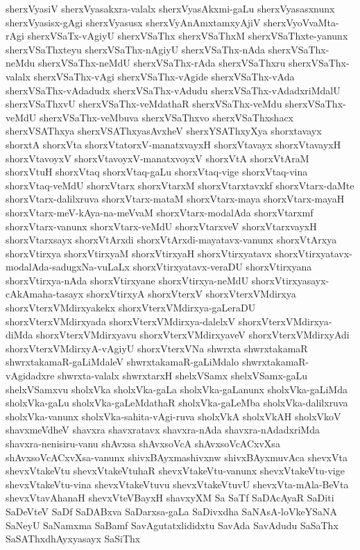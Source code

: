 {sherxVyasiV
sherxVyasakxra-valalx
sherxVyasAkxmi-gaLu
sherxVyasasxnunx
sherxVyasisx-gAgi
sherxVyasusx
sherxVyAnAmxtamxyAjiV
sherxVyoVvaMta-rAgi
sherxVSaTx-vAgiyU
sherxVSaThx
sherxVSaThxM
sherxVSaThxte-yanunx
sherxVSaThxteyu
sherxVSaThx-nAgiyU
sherxVSaThx-nAda
sherxVSaThx-neMdu
sherxVSaThx-neMdU
sherxVSaThx-rAda
sherxVSaThxru
sherxVSaThx-valalx
sherxVSaThx-vAgi
sherxVSaThx-vAgide
sherxVSaThx-vAda
sherxVSaThx-vAdadudx
sherxVSaThx-vAdudu
sherxVSaThx-vAdadxriMdalU
sherxVSaThxvU
sherxVSaThx-veMdathaR
sherxVSaThx-veMdu
sherxVSaThx-veMdU
sherxVSaThx-veMbuva
sherxVSaThxvo
sherxVSaThxshacx
sherxVSAThxya
sherxVSAThxyasAvxheV
sherxYSAThxyXya
shorxtavayx
shorxtA
shorxVta
shorxVtatorxV-manatxvayxH
shorxVtavayx
shorxVtavayxH
shorxVtavoyxV
shorxVtavoyxV-manatxvoyxV
shorxVtA
shorxVtAraM
shorxVtuH
shorxVtaq
shorxVtaq-gaLu
shorxVtaq-vige
shorxVtaq-vina
shorxVtaq-veMdU
shorxVtarx
shorxVtarxM
shorxVtarxtavxkf
shorxVtarx-daMte
shorxVtarx-dalilxruva
shorxVtarx-mataM
shorxVtarx-maya
shorxVtarx-mayaH
shorxVtarx-meV-kAya-na-meVvaM
shorxVtarx-modalAda
shorxVtarxmf
shorxVtarx-vanunx
shorxVtarx-veMdU
shorxVtarxveV
shorxVtarxvayxH
shorxVtarxsayx
shorxVtArxdi
shorxVtArxdi-mayatavx-vanunx
shorxVtArxya
shorxVtirxya
shorxVtirxyaM
shorxVtirxyaH
shorxVtirxyatavx
shorxVtirxyatavx-modalAda-sadugxNa-vuLaLx
shorxVtirxyatavx-veraDU
shorxVtirxyana
shorxVtirxya-nAda
shorxVtirxyane
shorxVtirxya-neMdU
shorxVtirxyasayx-cAkAmaha-tasayx
shorxVtirxyA
shorxVterxV
shorxVterxVMdirxya
shorxVterxVMdirxyakekx
shorxVterxVMdirxya-gaLeraDU
shorxVterxVMdirxyada
shorxVterxVMdirxya-dalelxV
shorxVterxVMdirxya-diMda
shorxVterxVMdirxyavu
shorxVterxVMdirxyaveV
shorxVterxVMdirxyAdi
shorxVterxVMdirxyA-vAgiyU
shorxVterxVNa
shwrxta
shwrxtakamaR
shwrxtakamaR-gaLiMdaleV
shwrxtakamaR-gaLiMdalo
shwrxtakamaR-vAgidadxre
shwrxta-valalx
shwrxtarxH
shelxVSamx
shelxVSamx-gaLu
shelxVSamxvu
sholxVka
sholxVka-gaLa
sholxVka-gaLanunx
sholxVka-gaLiMda
sholxVka-gaLu
sholxVka-gaLeMdathaR
sholxVka-gaLeMba
sholxVka-dalilxruva
sholxVka-vanunx
sholxVka-sahita-vAgi-ruva
sholxVkA
sholxVkAH
sholxVkoV
shavxmeVdheV
shavxra
shavxratavx
shavxra-nAda
shavxra-nAdadxriMda
shavxra-nenisiru-vanu
shAvxsa
shAvxsoVcA
shAvxsoVcACxvXsa
shAvxsoVcACxvXsa-vanunx
shivxBAyxmashivxnw
shivxBAyxmuvAca
shevxVta
shevxVtakeVtu
shevxVtakeVtuhaR
shevxVtakeVtu-vanunx
shevxVtakeVtu-vige
shevxVtakeVtu-vina
shevxVtakeVtuvu
shevxVtakeVtuvU
shevxVta-mAla-BeVta
shevxVtavAhanaH
shevxVteVBayxH
shavxyXM
Sa
SaTf
SaDAcAyaR
SaDiti
SaDeVteV
SaDf
SaDABxva
SaDarxsa-gaLa
SaDivxdha
SaNAsA-loVkeYSaNA
SaNeyU
SaNamxma
SaBamf
SavAgutatxlididxtu
SavAda
SavAdudu
SaSaThx
SaSAThxdhAyxyasayx
SaSiThx
}

